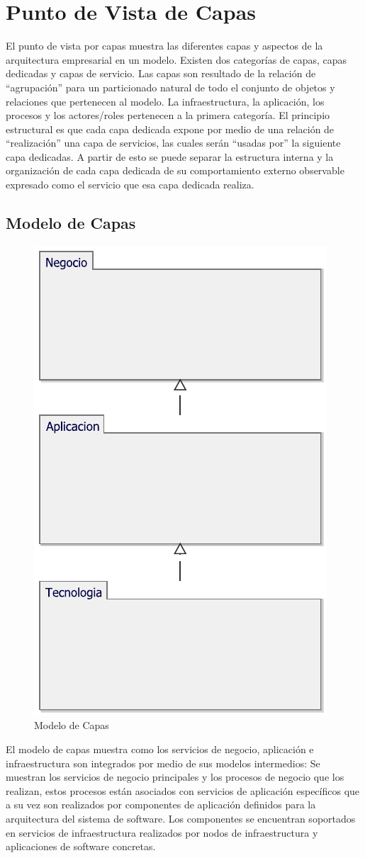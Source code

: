 \section{Punto de Vista de Capas}

El punto de vista por capas muestra las diferentes capas y aspectos de la arquitectura empresarial en un modelo. Existen dos categorías de capas, capas dedicadas y capas de servicio. Las capas son resultado de la relación de “agrupación” para un particionado natural de todo el conjunto de objetos y relaciones que pertenecen al modelo. La infraestructura, la aplicación, los procesos y los actores/roles pertenecen a la primera categoría. El principio estructural es que cada capa dedicada expone por medio de una relación de “realización” una capa de servicios, las cuales serán “usadas por” la siguiente capa dedicadas. A partir de esto se puede separar la estructura interna y la organización de cada capa dedicada de su comportamiento externo observable expresado como el servicio que esa capa dedicada realiza. 

\subsection{Modelo de Capas}
\begin{figure}[h!]
	\centering
	\includegraphics[width=.5\linewidth]{imgs/modelo/Capas}
	\caption{Modelo de Capas}
\end{figure}

El modelo de capas muestra como los servicios de negocio, aplicación e infraestructura son integrados por medio de sus modelos intermedios: Se muestran los servicios de negocio principales y los procesos de negocio que los realizan, estos procesos están asociados con servicios de aplicación específicos que a su vez son realizados por componentes de aplicación definidos para la arquitectura del sistema de software. Los componentes se encuentran soportados en servicios de infraestructura realizados por nodos de infraestructura y aplicaciones de software concretas.


